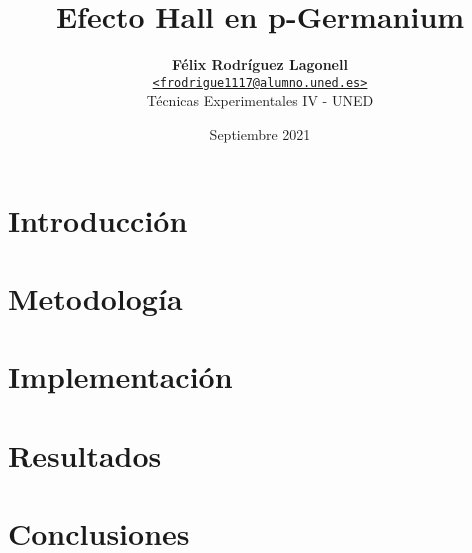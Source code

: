 \documentclass[a4paper, twocolumn]{article}
\title{\vspace{-1.5em}\textbf{Efecto Hall en p-Germanium}}
\author{{\textbf{Félix Rodríguez Lagonell}} \\
        {\href{mailto:erija578@student.liu.se}
        {\texttt{<frodrigue1117@alumno.uned.es>}}} \\
        {Técnicas Experimentales IV - UNED}}
\date{Septiembre 2021}
\begin{document}
    \maketitle

    \begin{abstract}  \end{abstract} %
    \section{Introducción} \label{sec:introduction} 
    \section{Metodología} \label{sec:related_work} 
    \section{Implementación} \label{sec:implementation} 
    \section{Resultados} \label{sec:results} 
    \section{Conclusiones} \label{sec:conclusions} 

    \nocite{*} %
    
    
    \appendix

    
\end{document}
